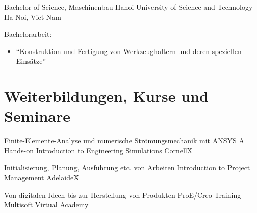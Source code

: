 \documentclass[11pt,a4paper,sans]{moderncv}
\begin{document}
{Bachelor of Science, Maschinenbau}
{Hanoi University of Science and Technology}
{Ha Noi, Viet Nam}
{}
{
    Bachelorarbeit:
    \begin{itemize}
        \item "`Konstruktion und Fertigung von Werkzeughaltern und deren speziellen Einsätze"'
    \end{itemize}
}


\section{\textbf{Weiterbildungen, Kurse und Seminare}}

{Finite-Elemente-Analyse und numerische Strömungsmechanik mit ANSYS}
{A Hands-on Introduction to Engineering Simulations}
{CornellX}
{}
{}

{Initialisierung, Planung, Ausführung etc. von Arbeiten}
{Introduction to Project Management}
{AdelaideX}
{}
{}

{Von digitalen Ideen bis zur Herstellung von Produkten}
{ProE/Creo Training}
{Multisoft Virtual Academy}
{}
{}



\end{document}
